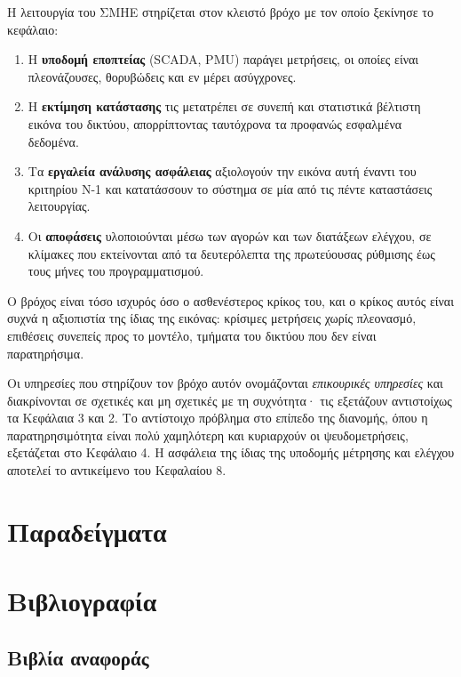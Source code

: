 Η λειτουργία του ΣΜΗΕ στηρίζεται στον κλειστό βρόχο με τον οποίο ξεκίνησε το κεφάλαιο:

\begin{enumerate}
\item Η \textbf{υποδομή εποπτείας} (SCADA, PMU) παράγει μετρήσεις, οι οποίες είναι
      πλεονάζουσες, θορυβώδεις και εν μέρει ασύγχρονες.
\item Η \textbf{εκτίμηση κατάστασης} τις μετατρέπει σε συνεπή και στατιστικά βέλτιστη
      εικόνα του δικτύου, απορρίπτοντας ταυτόχρονα τα προφανώς εσφαλμένα δεδομένα.
\item Τα \textbf{εργαλεία ανάλυσης ασφάλειας} αξιολογούν την εικόνα αυτή έναντι του
      κριτηρίου N-1 και κατατάσσουν το σύστημα σε μία από τις πέντε καταστάσεις λειτουργίας.
\item Οι \textbf{αποφάσεις} υλοποιούνται μέσω των αγορών και των διατάξεων ελέγχου, σε
      κλίμακες που εκτείνονται από τα δευτερόλεπτα της πρωτεύουσας ρύθμισης έως τους μήνες
      του προγραμματισμού.
\end{enumerate}

Ο βρόχος είναι τόσο ισχυρός όσο ο ασθενέστερος κρίκος του, και ο κρίκος αυτός είναι συχνά
η αξιοπιστία της ίδιας της εικόνας: κρίσιμες μετρήσεις χωρίς πλεονασμό, επιθέσεις συνεπείς
προς το μοντέλο, τμήματα του δικτύου που δεν είναι παρατηρήσιμα.

Οι υπηρεσίες που στηρίζουν τον βρόχο αυτόν ονομάζονται \emph{επικουρικές υπηρεσίες} και
διακρίνονται σε σχετικές και μη σχετικές με τη συχνότητα· τις εξετάζουν αντιστοίχως τα
Κεφάλαια 3 και 2. Το αντίστοιχο πρόβλημα στο επίπεδο της διανομής, όπου η παρατηρησιμότητα
είναι πολύ χαμηλότερη και κυριαρχούν οι ψευδομετρήσεις, εξετάζεται στο Κεφάλαιο 4. Η
ασφάλεια της ίδιας της υποδομής μέτρησης και ελέγχου αποτελεί το αντικείμενο του
Κεφαλαίου 8.

\section{Παραδείγματα}
\label{kef-01-paradeigmata}

\section{Βιβλιογραφία}
\label{kef-01-vivliografia}

\subsection*{Βιβλία αναφοράς}

